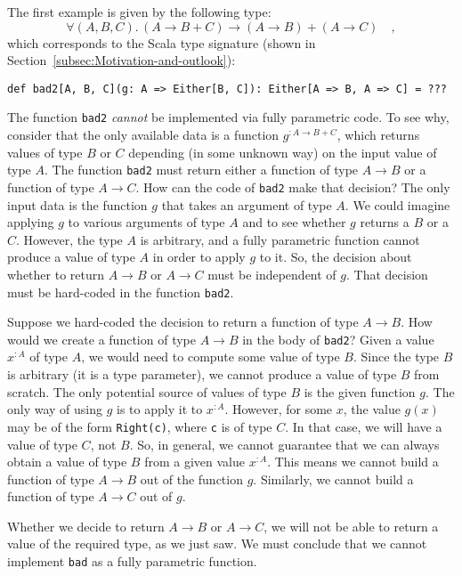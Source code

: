 The first example is given by the following type:
\begin{equation}
\forall(A,B,C).\,\left(A\rightarrow B+C\right)\rightarrow\left(A\rightarrow B\right)+\left(A\rightarrow C\right)\quad,\label{eq:ch-example-boolean-bad-type}
\end{equation}
which corresponds to the Scala type signature (shown in Section~\ref{subsec:Motivation-and-outlook}):
\begin{lstlisting}
def bad2[A, B, C](g: A => Either[B, C]): Either[A => B, A => C] = ???
\end{lstlisting}
The function \lstinline!bad2! \emph{cannot} be implemented via fully
parametric code. To see why, consider that the only available data
is a function $g^{:A\rightarrow B+C}$, which returns values of type
$B$ or $C$ depending (in some unknown way) on the input value of
type $A$. The function \lstinline!bad2! must return either a function
of type $A\rightarrow B$ or a function of type $A\rightarrow C$.
How can the code of \lstinline!bad2! make that decision? The only
input data is the function $g$ that takes an argument of type $A$.
We could imagine applying $g$ to various arguments of type $A$ and
to see whether $g$ returns a $B$ or a $C$. However, the type $A$
is arbitrary, and a fully parametric function cannot produce a value
of type $A$ in order to apply $g$ to it. So, the decision about
whether to return $A\rightarrow B$ or $A\rightarrow C$ must be independent
of $g$. That decision must be hard-coded in the function \lstinline!bad2!.

Suppose we hard-coded the decision to return a function of type $A\rightarrow B$.
How would we create a function of type $A\rightarrow B$ in the body
of \lstinline!bad2!? Given a value $x^{:A}$ of type $A$, we would
need to compute some value of type $B$. Since the type $B$ is arbitrary
(it is a type parameter), we cannot produce a value of type $B$ from
scratch. The only potential source of values of type $B$ is the given
function $g$. The only way of using $g$ is to apply it to $x^{:A}$.
However, for some $x$, the value $g(x)$ may be of the form \lstinline!Right(c)!,
where \lstinline!c! is of type $C$. In that case, we will have a
value of type $C$, not $B$. So, in general, we cannot guarantee
that we can always obtain a value of type $B$ from a given value
$x^{:A}$. This means we cannot build a function of type $A\rightarrow B$
out of the function $g$. Similarly, we cannot build a function of
type $A\rightarrow C$ out of $g$. 

Whether we decide to return $A\rightarrow B$ or $A\rightarrow C$,
we will not be able to return a value of the required type, as we
just saw. We must conclude that we cannot implement \lstinline!bad!
as a fully parametric function.

